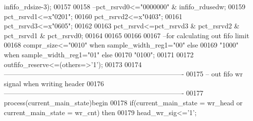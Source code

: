 \begin{DoxyCode}
{      infifo_rdsize}\textcolor{vhdlchar}{-}\textcolor{vhdllogic}{}\textcolor{vhdllogic}{3}\textcolor{vhdlchar}{)};
00157 
00158 \textcolor{keyword}{  --pct\_rsrvd0<="0000000" & infifo\_rdusedw;}
00159   \textcolor{vhdlchar}{pct_rsrvd1}\textcolor{vhdlchar}{<=}\textcolor{vhdlchar}{x}\textcolor{vhdllogic}{"0201"};
00160   \textcolor{vhdlchar}{pct_rsrvd2}\textcolor{vhdlchar}{<=}\textcolor{vhdlchar}{x}\textcolor{vhdllogic}{"0403"};
00161   \textcolor{vhdlchar}{pct_rsrvd3}\textcolor{vhdlchar}{<=}\textcolor{vhdlchar}{x}\textcolor{vhdllogic}{"0605"};
00162   
00163   \textcolor{vhdlchar}{pct_rsrvd}\textcolor{vhdlchar}{<=}\textcolor{vhdlchar}{pct_rsrvd3} \textcolor{vhdlchar}{&} \textcolor{vhdlchar}{pct_rsrvd2} \textcolor{vhdlchar}{&} \textcolor{vhdlchar}{pct_rsrvd1} \textcolor{vhdlchar}{&} \textcolor{vhdlchar}{pct_rsrvd0};
00164   
00165 
00166 
00167 \textcolor{keyword}{--for calculating out fifo limit  }
00168   \textcolor{vhdlchar}{compr_size}\textcolor{vhdlchar}{<=}\textcolor{vhdllogic}{"0010"} \textcolor{keywordflow}{when} \textcolor{vhdlchar}{sample_width_reg1}\textcolor{vhdlchar}{=}\textcolor{vhdllogic}{"00"} \textcolor{keywordflow}{else} 
00169               \textcolor{vhdllogic}{"1000"} \textcolor{keywordflow}{when} \textcolor{vhdlchar}{sample_width_reg1}\textcolor{vhdlchar}{=}\textcolor{vhdllogic}{"01"} \textcolor{keywordflow}{else}
00170               \textcolor{vhdllogic}{"0100"};
00171                   
00172   \textcolor{vhdlchar}{outfifo_reserve}\textcolor{vhdlchar}{<=}\textcolor{vhdlchar}{(}\textcolor{keywordflow}{others}\textcolor{vhdlchar}{=}\textcolor{vhdlchar}{>}\textcolor{vhdlchar}{'}\textcolor{vhdllogic}{}\textcolor{vhdllogic}{1}\textcolor{vhdlchar}{'}\textcolor{vhdlchar}{)}; 
00173   
00174 \textcolor{keyword}{-------------------------------------------------------------------------------}
00175 \textcolor{keyword}{-- out fifo wr signal when writing header}
00176 \textcolor{keyword}{-------------------------------------------------------------------------------  }
00177  \textcolor{keywordflow}{process}(current_main_state)\textcolor{keywordflow}{begin}
00178     \textcolor{keywordflow}{if}\textcolor{vhdlchar}{(}\textcolor{vhdlchar}{current_main_state} \textcolor{vhdlchar}{=} \textcolor{vhdlchar}{wr\_head} \textcolor{keywordflow}{or} \textcolor{vhdlchar}{current_main_state} \textcolor{vhdlchar}{=} \textcolor{vhdlchar}{wr\_cnt}\textcolor{vhdlchar}{)} \textcolor{keywordflow}{then}
00179         \textcolor{vhdlchar}{head_wr_sig}\textcolor{vhdlchar}{<=}\textcolor{vhdlchar}{'}\textcolor{vhdllogic}{}\textcolor{vhdllogic}{1}\textcolor{vhdlchar}{'};

\end{DoxyCode}
